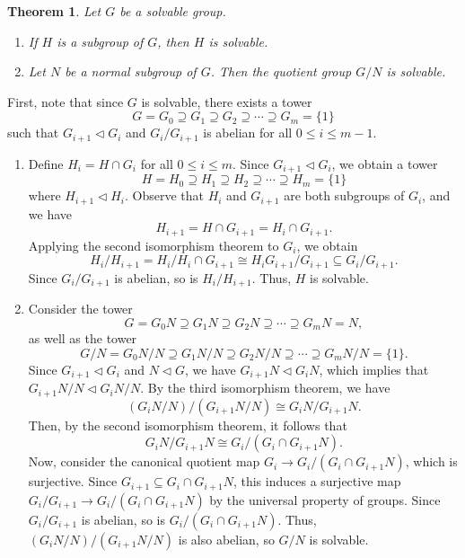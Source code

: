 \documentclass[10pt]{article}
\makeatletter
\newcommand{\norm}{\triangleleft}
\theoremstyle{newstyle}
\newtheorem{thm}{Theorem}[section]
\newenvironment{pf}[1][\proofname]{\par
  \pushQED{\qed}%
  \normalfont \topsep0\p@\relax
  \trivlist
  \item[\hskip\labelsep\scshape
  #1\@addpunct{.}]\ignorespaces
}{%
  \popQED\endtrivlist\@endpefalse
}
\makeatother
\begin{document}
\begin{thm}
Let $G$ be a solvable group.
\begin{enumerate}[(1)]
    \item If $H$ is a subgroup of $G$, then $H$ is solvable.
    \item Let $N$ be a normal subgroup of $G$. Then the quotient group $G/N$ is solvable. 
\end{enumerate}
\end{thm}
\begin{pf}
First, note that since $G$ is solvable, there exists a tower 
\[ G = G_0 \supseteq G_1 \supseteq G_2 \supseteq \cdots \supseteq G_m = \{1\} \]
such that $G_{i+1} \triangleleft G_i$ and $G_i/G_{i+1}$ is abelian for all $0 \leq i \leq m-1$. 
\begin{enumerate}[(1)]
    \item Define $H_i = H \cap G_i$ for all $0 \leq i \leq m$. Since $G_{i+1} \norm G_i$, 
    we obtain a tower 
    \[ H = H_0 \supseteq H_1 \supseteq H_2 \supseteq \cdots \supseteq H_m = \{1\} \]
    where $H_{i+1} \norm H_i$. Observe that $H_i$ and $G_{i+1}$ are both subgroups of $G_i$, 
    and we have 
    \[ H_{i+1} = H \cap G_{i+1} = H_i \cap G_{i+1}. \]
    Applying the second isomorphism theorem to $G_i$, we obtain
    \[ H_i/H_{i+1} = H_i/H_i \cap G_{i+1} \cong H_i G_{i+1}/G_{i+1} \subseteq G_i/G_{i+1}. \]
    Since $G_i/G_{i+1}$ is abelian, so is $H_i/H_{i+1}$. Thus, $H$ is solvable. 
    
    \item Consider the tower 
    \[ G = G_0N \supseteq G_1N \supseteq G_2N \supseteq \cdots \supseteq G_mN = N, \]
    as well as the tower 
    \[ G/N = G_0N/N \supseteq G_1N/N \supseteq G_2N/N \supseteq \cdots \supseteq G_mN/N = \{1\}. \]
    Since $G_{i+1} \norm G_i$ and $N \norm G$, we have $G_{i+1}N \norm G_iN$, which implies that 
    $G_{i+1}N/N \norm G_iN/N$. By the third isomorphism theorem, we have 
    \[ (G_iN/N)/(G_{i+1}N/N) \cong G_iN/G_{i+1}N. \]
    Then, by the second isomorphism theorem, it follows that 
    \[ G_iN/G_{i+1}N \cong G_i/(G_i \cap G_{i+1}N). \]
    Now, consider the canonical quotient map $G_i \to G_i/(G_i \cap G_{i+1}N)$, which is 
    surjective. Since $G_{i+1} \subseteq G_i \cap G_{i+1}N$, this induces a surjective 
    map $G_i/G_{i+1} \to G_i/(G_i \cap G_{i+1}N)$ by the universal property of groups. 
    Since $G_i/G_{i+1}$ is abelian, so is $G_i/(G_i \cap G_{i+1}N)$. Thus, 
    $(G_iN/N)/(G_{i+1}N/N)$ is also abelian, so $G/N$ is solvable. \qedhere 
\end{enumerate}
\end{pf}
\end{document}
